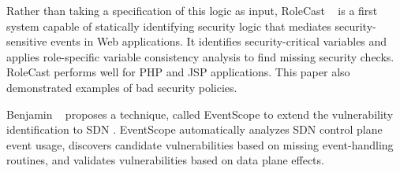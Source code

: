 Rather than taking a specification of this logic as input, RoleCast \etal~\cite{10.1145/2048066.2048146} is a first system capable of statically identifying security logic that mediates security-sensitive events in Web applications. It identifies security-critical variables and applies role-specific variable consistency analysis to find missing security checks. RoleCast performs well for PHP and JSP applications. This paper also demonstrated examples of bad security policies.

Benjamin \etal~\cite{inproceedings} proposes a technique, called EventScope to extend the vulnerability identification to SDN \cite{6994333}. EventScope automatically analyzes SDN control plane event usage, discovers candidate vulnerabilities based on missing event-handling routines, and validates vulnerabilities based on data plane effects.

